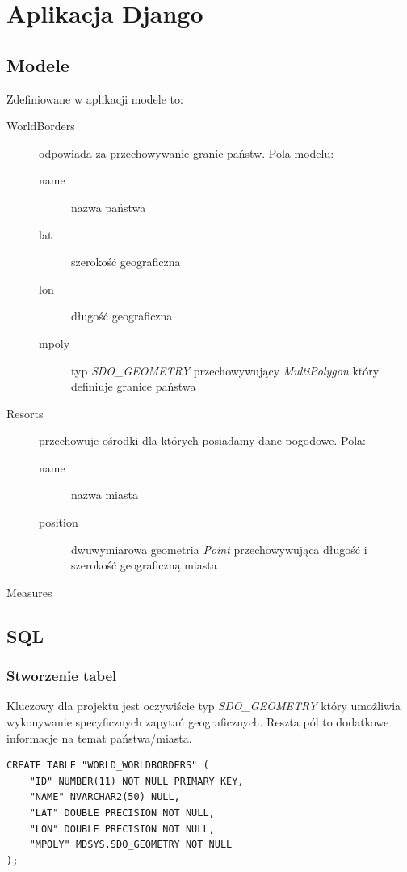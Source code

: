 \documentclass[12pt]{article}
\begin{document}
\section{Aplikacja Django}
\subsection{Modele}
Zdefiniowane w aplikacji modele to:
\begin{description}
\item[WorldBorders] odpowiada za przechowywanie granic państw. Pola modelu:
  \begin{description}
  \item[name] nazwa państwa
  \item[lat] szerokość geograficzna
  \item[lon] długość geograficzna
  \item[mpoly] typ \emph{SDO\_GEOMETRY} przechowywujący \emph{MultiPolygon} który
    definiuje granice państwa
  \end{description}
\item[Resorts] przechowuje ośrodki dla których posiadamy dane pogodowe. Pola:
  \begin{description}
    \item[name] nazwa miasta
    \item[position] dwuwymiarowa geometria \emph{Point} przechowywująca długość i
      szerokość geograficzną miasta
  \end{description}
\item[Measures]
  \begin{description}
  \end{description}
\end{description}

\subsection{SQL}
\subsubsection{Stworzenie tabel}
Kluczowy dla projektu jest oczywiście typ \emph{SDO\_GEOMETRY} który umożliwia wykonywanie
specyficznych zapytań geograficznych. Reszta pól to dodatkowe informacje na temat państwa/miasta.
\begin{verbatim}
CREATE TABLE "WORLD_WORLDBORDERS" (
    "ID" NUMBER(11) NOT NULL PRIMARY KEY,
    "NAME" NVARCHAR2(50) NULL,
    "LAT" DOUBLE PRECISION NOT NULL,
    "LON" DOUBLE PRECISION NOT NULL,
    "MPOLY" MDSYS.SDO_GEOMETRY NOT NULL
);
\end{verbatim}
\end{document}
